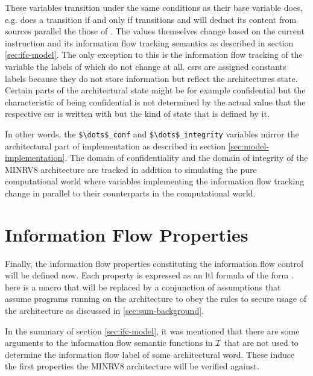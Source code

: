 These variables transition under the same conditions as their base variable does, e.g.  does a transition if and only if  transitions and  will deduct its content from sources parallel the those of .
The values themselves change based on the current instruction and its information flow tracking semantics as described in section \ref{sec:ifc-model}.
The only exception to this is the information flow tracking of the variable  the labels of which do not change at all.
\Glspl{csr} are assigned constants labels because they do not store information but reflect the architectures state.
Certain parts of the architectural state might be for example confidential but the characteristic of being confidential is not determined by the actual value that the respective \gls{csr} is written with but the kind of state that is defined by it.

In other words, the \lstinline[language=SMV,mathescape]{$\dots$_conf} and \lstinline[language=SMV,mathescape]{$\dots$_integrity} variables mirror the architectural part of implementation as described in section \ref{sec:model-implementation}.
The domain of confidentiality and the domain of integrity of the MINRV8 architecture are tracked in addition to simulating the pure computational world where variables implementing the information flow tracking change in parallel to their counterparts in the computational world.

\section{Information Flow Properties}
\label{sec:ifc-properties}

Finally, the information flow properties constituting the information flow control will be defined now.
Each property is expressed as an \gls{ltl} formula of the form .
 here is a macro that will be replaced by a conjunction of assumptions that assume programs running on the architecture to obey the rules to secure usage of the architecture as discussed in \ref{sec:sum-background}.

In the summary of section \ref{sec:ifc-model}, it was mentioned that there are some arguments to the information flow semantic functions in $ \mathcal{I} $ that are not used to determine the information flow label of some architectural word.
These induce the first properties the MINRV8 architecture will be verified against.

